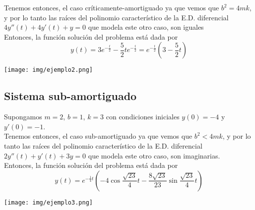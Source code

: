 \documentclass[11pt]{amsart}
\begin{document}
Tenemos entonces, el caso cr\'{i}ticamente-amortiguado ya que vemos que $b^2 = 4mk$, y por lo tanto las ra\'{i}ces del polinomio caracter\'{i}stico de la E.D. diferencial $4y''(t) + 4y'(t) + y = 0$ que modela este otro caso, son iguales\\

Entonces, la funci\'{o}n soluci\'{o}n del problema est\'{a} dada por
\[ y(t) = 3e^{-\frac{t}{2}} - \frac{5}{2}te^{-\frac{t}{2}} = e^{-\frac{t}{2}}(3-\frac{5}{2}t) \]

\begin{center}
\texttt{[image: img/ejemplo2.png]}
\end{center}

\subsection{Sistema sub-amortiguado}

Supongamos $m=2$, $b=1$, $k=3$ con condiciones iniciales $y(0) = -4$ y $y'(0) = -1$.\\

Tenemos entonces, el caso sub-amortiguado ya que vemos que $b^2 < 4mk$, y por lo tanto las ra\'{i}ces del polinomio caracter\'{i}stico de la E.D. diferencial $2y''(t) + y'(t) + 3y = 0$ que modela este otro caso, son imaginarias.\\

Entonces, la funci\'{o}n soluci\'{o}n del problema est\'{a} dada por
\[ y(t) =  e^{-\frac{1}{4}t}(-4\cos{\frac{\sqrt{23}}{4}t} - \frac{8\sqrt{23}}{23}\sin{\frac{\sqrt{23}}{4}t})\]

\begin{center}
\texttt{[image: img/ejemplo3.png]}
\end{center}
\end{document}
